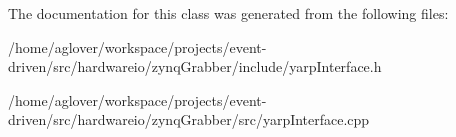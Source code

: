 The documentation for this class was generated from the following files\+:\begin{DoxyCompactItemize}
\item 
/home/aglover/workspace/projects/event-\/driven/src/hardwareio/zynq\+Grabber/include/yarp\+Interface.\+h\item 
/home/aglover/workspace/projects/event-\/driven/src/hardwareio/zynq\+Grabber/src/yarp\+Interface.\+cpp\end{DoxyCompactItemize}
